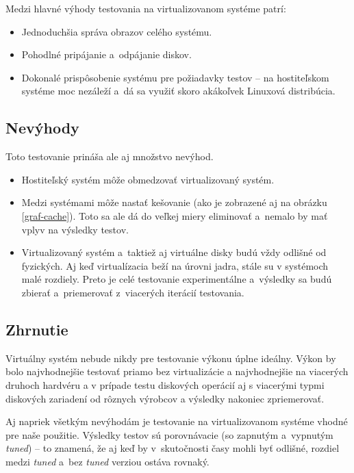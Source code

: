 Medzi hlavné výhody testovania na virtualizovanom systéme patrí:

\begin{itemize}
    \item Jednoduchšia správa obrazov celého systému.
    \item Pohodlné pripájanie a~odpájanie diskov.
    \item Dokonalé prispôsobenie systému pre požiadavky testov -- na
    hostiteľskom systéme moc nezáleží a~dá sa využiť skoro akákoľvek Linuxová
    distribúcia.
\end{itemize}

\subsection{Nevýhody}

Toto testovanie prináša ale aj množstvo nevýhod. 

\begin{itemize}
    \item Hostiteľský systém môže obmedzovať virtualizovaný systém.
    \item Medzi systémami môže nastať kešovanie (ako je zobrazené aj na obrázku
    \ref{graf-cache}). Toto sa ale dá do veľkej miery eliminovať a~nemalo by
    mať vplyv na výsledky testov.
    \item Virtualizovaný systém a~taktiež aj virtuálne disky budú vždy odlišné
    od fyzických. Aj keď virtualízacia beží na úrovni jadra, stále su v
    systémoch malé rozdiely. Preto je celé testovanie experimentálne a~výsledky
    sa budú zbierať a~priemerovať z~viacerých iterácií testovania.
\end{itemize}

\subsection{Zhrnutie}

Virtuálny systém nebude nikdy pre testovanie výkonu úplne ideálny. Výkon by bolo najvhodnejšie testovať priamo bez virtualizácie a najvhodnejšie na viacerých druhoch hardvéru a v prípade testu diskových operácií aj s viacerými typmi diskových zariadení od rôznych výrobcov a výsledky nakoniec zpriemerovať.  

Aj napriek všetkým nevýhodám je testovanie na virtualizovanom systéme vhodné
pre naše použitie.  Výsledky testov sú porovnávacie (so zapnutým a~vypnutým
\emph{tuned}) -- to znamená, že aj keď by v~skutočnosti časy mohli byť odlišné,
rozdiel medzi \emph{tuned} a~bez \emph{tuned} verziou ostáva rovnaký.

